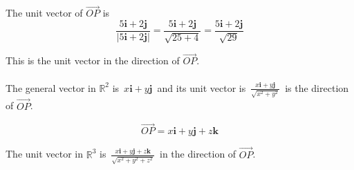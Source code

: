 \documentclass[11pt,a4paper]{article}
\theoremstyle{definition}
\begin{document}
The unit vector of $\overrightarrow{OP}$ is 
$$\frac{5\textbf{i} + 2\textbf{j}}{\left|5\textbf{i} + 2\textbf{j}\right|} = \frac{5\textbf{i} + 2\textbf{j}}{\sqrt{25 + 4}} = \frac{5\textbf{i} + 2\textbf{j}}{\sqrt{29}}$$

This is the unit vector in the direction of $\overrightarrow{OP}$.\\\\


The general vector in $\mathbb{R}^2$ is $\, x\textbf{i} + y \textbf{j}\,$ and its unit vector is $\,\frac{x\textbf{i} + y \textbf{j}}{\sqrt{x^2 + y^2}}\,$ is the direction of $\overrightarrow{OP}$.



\begin{figure}[H]
\centering
{}
\end{figure}














$$\overrightarrow{OP} =  x\textbf{i} + y \textbf{j} +  z\textbf{k}$$ 


The unit vector in $\mathbb{R}^3$ is $\,\frac{x\textbf{i} + y \textbf{j} +  z\textbf{k}}{\sqrt{x^2 + y^2 + z^2}}\,$ in the direction of $\overrightarrow{OP}$.\\\\
\end{document}
